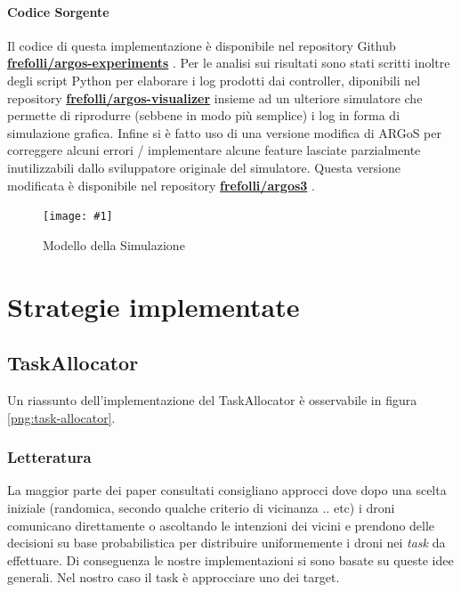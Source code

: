 \documentclass[a4paper,11pt,oneside, table]{article}
\newcommand{\putimage}[4] {
	\begin{figure}[H]
	    \centering
	    \texttt{[image: \#1]}
	    \caption{#2}\label{#3}
	\end{figure}
}
\begin{document}
\paragraph{Codice Sorgente}

Il codice di questa implementazione \`e disponibile nel repository Github \textbf{\href{http://github.com/frefolli/argos-experiments}{frefolli/argos-experiments}} \cite{RF:AE}.
Per le analisi sui risultati sono stati scritti inoltre degli script Python per elaborare i log prodotti dai controller, diponibili nel repository \textbf{\href{http://github.com/frefolli/argos-visualizer}{frefolli/argos-visualizer}} \cite{RF:AV} insieme ad un ulteriore simulatore che permette di riprodurre (sebbene in modo pi\`u semplice) i log in forma di simulazione grafica.
Infine si \`e fatto uso di una versione modifica di ARGoS per correggere alcuni errori / implementare alcune feature lasciate parzialmente inutilizzabili dallo sviluppatore originale del simulatore. Questa versione modificata \`e disponibile nel repository \textbf{\href{http://github.com/frefolli/argos3}{frefolli/argos3}} \cite{RF:A3}.

\putimage{images/simulation-model.png}{Modello della Simulazione}{png:simulation-model}{0.99}

\section{Strategie implementate}

\subsection{TaskAllocator}

Un riassunto dell'implementazione del TaskAllocator \`e osservabile in figura \ref{png:task-allocator}.

\subsubsection{Letteratura}

La maggior parte dei paper consultati consigliano approcci dove dopo una scelta iniziale (randomica, secondo qualche criterio di vicinanza .. etc) i droni comunicano direttamente o ascoltando le intenzioni dei vicini e prendono delle decisioni su base probabilistica per distribuire uniformemente i droni nei \textit{task} da effettuare.
Di conseguenza le nostre implementazioni si sono basate su queste idee generali. Nel nostro caso il task \`e approcciare uno dei target.
\end{document}
